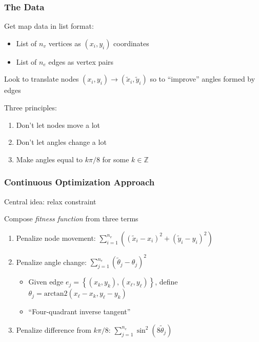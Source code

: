 \documentclass[12pt,t,xcolor=dvipsnames]{beamer}
\begin{document}
\begin{frame}
  \frametitle{The Data}

  Get map data in list format:
  \begin{itemize}
  \item List of $n_v$ vertices as $(x_i,y_i)$ coordinates
  \item List of $n_e$ edges as vertex pairs
  \end{itemize}

  \begin{center}
    Look to translate nodes $(x_i,y_i) \rightarrow (\tilde{x}_i,\tilde{y}_i)$ so
    to ``improve'' angles formed by edges
  \end{center}
\pause
  Three principles:
  \begin{enumerate}
  \item Don't let nodes move a lot
  \item Don't let angles change a lot
  \item Make angles equal to $k\pi/8$ for some $k\in\mathbb{Z}$
  \end{enumerate}


\end{frame}


\begin{frame}
  \frametitle{Continuous Optimization Approach}

  \begin{center}
    Central idea: relax constraint
  \end{center}

  Compose {\it fitness function} from three terms
  \begin{enumerate}
  \item Penalize node movement: $\displaystyle\sum_{i=1}^{n_v}
    \left((\tilde{x}_i-x_i)^2+(\tilde{y}_i - y_i)^2\right)$
  \item Penalize angle change: $\displaystyle\sum_{j=1}^{n_e} \left(\tilde{\theta}_j -
    \theta_j\right)^2$
    \begin{itemize}
    \item Given edge $e_j = \left\{(x_k,y_k),(x_\ell,y_\ell)\right\}$,
      define $\theta_j = \text{arctan2}(x_\ell-x_k,y_\ell-y_k)$
      \item ``Four-quadrant inverse tangent''
    \end{itemize}
    \item Penalize difference from $k\pi/8$: $\displaystyle\sum_{j=1}^{n_e}\sin^2\left(8\tilde{\theta}_j\right)$
  \end{enumerate}
  
\end{frame}
\end{document}
